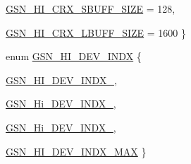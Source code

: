 \begin{DoxyCompactItemize}
\par
\hyperlink{a00504_a08d83a81fbc89f1d44c527a3f5ee68e9a46de337fa76c358c91c60c752e5dd106}{GSN\_\-HI\_\-CRX\_\-SBUFF\_\-SIZE} =  128, 
\par
\hyperlink{a00504_a08d83a81fbc89f1d44c527a3f5ee68e9ac29709a63467628e63d52b5b7f94b68f}{GSN\_\-HI\_\-CRX\_\-LBUFF\_\-SIZE} =  1600
 \}
\item 
enum \hyperlink{a00504_a8a2a6fba490f79e27c9537b300d8f830}{GSN\_\-HI\_\-DEV\_\-INDX} \{ \par
\hyperlink{a00504_a8a2a6fba490f79e27c9537b300d8f830a02a620b4de54ddafb59811f01854a988}{GSN\_\-HI\_\-DEV\_\-INDX\_}, 
\par
\hyperlink{a00504_a8a2a6fba490f79e27c9537b300d8f830a4b7666e86a4e4290b97f1dd2975d2dda}{GSN\_\-Hi\_\-DEV\_\-INDX\_}, 
\par
\hyperlink{a00504_a8a2a6fba490f79e27c9537b300d8f830a1d001a61175a0eb3cb31828cff627621}{GSN\_\-Hi\_\-DEV\_\-INDX\_}, 
\par
\hyperlink{a00504_a8a2a6fba490f79e27c9537b300d8f830a2514241b6314f36256d680c3c1bcccc3}{GSN\_\-HI\_\-DEV\_\-INDX\_\-MAX}
 \}
\end{DoxyCompactItemize}
